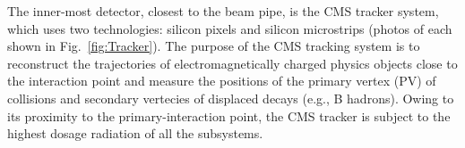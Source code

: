 
The inner-most detector, closest to the beam pipe, is the CMS tracker system, which uses two technologies: silicon pixels and silicon microstrips (photos of each shown in Fig.~\ref{fig:Tracker}). The purpose of the CMS tracking system is to reconstruct the trajectories of electromagnetically charged physics objects close to the interaction point and measure the positions of the primary vertex (PV) of collisions and secondary vertecies of displaced decays (e.g., B hadrons). Owing to its proximity to the primary-interaction point, the CMS tracker is subject to the highest dosage radiation of all the subsystems.

\begin{figure}[H]
    \centering
\end{figure}
